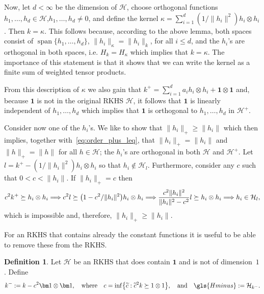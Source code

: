 \documentclass[10pt]{amsart}
\theoremstyle{definition}\newtheorem{defi}[theo]{Definition}\newtheorem{rema}[theo]{Remark}\newtheorem{exam}[theo]{Example}\newtheorem{exem}[theo]{Example}\newtheorem{nota}[theo]{Notation}
\theoremstyle{remark}
\DeclareMathOperator{\spn}{span}
\newcommand{\cH}{\mathcal{H}}
\let\oldtilde\tilde
\renewcommand*{\tilde}[1]{\mathchoice{\widetilde{#1}}{\widetilde{#1}}{\oldtilde{#1}}{\oldtilde{#1}}}
\renewcommand*{\implies}{\mathchoice{\Longrightarrow}{\Rightarrow}{\Rightarrow}{\Rightarrow}}
\let\originalleft\left
\let\originalright\right
\renewcommand{\left}{\mathopen{}\mathclose\bgroup\originalleft}
\renewcommand{\right}{\aftergroup\egroup\originalright}
\begin{document}
\pagebreak

Now, let $d< \infty $ be the dimension of $\cH$, choose orthogonal functions $h_1,\dots, h_d \in \cH$,\linebreak $h_1,\dots,h_d \not = 0$, and define the kernel $\kappa = \sum_{i=1}^d (1/\|h_i\|^2) h_i \otimes h_i$. Then $k = \kappa$. This follows because, according to the above lemma, both spaces consist of $\spn\{h_1,\dots, h_d\}$, $\|h_i\|_\kappa = \|h_i\|_k$, for all $i\leq d$, and the $h_i$'s are orthogonal in both spaces, i.e. $H_k = H_\kappa$ which implies that $k=\kappa$. The importance of this statement is that it shows that we can write the kernel as a finite sum of weighted tensor products.


From this description of $\kappa$ we also gain that $k^+ = \sum_{i=1}^d a_i h_i \otimes h_i + \bm 1 \otimes \bm 1$ and, because $\bm 1$ is not in the original RKHS $\cH$, it follows that $\bm 1$ is linearly independent of $h_1,\dots, h_d$ which implies that $\bm 1$ is orthogonal to $h_1,\dots, h_d$ in $\cH^+$.

Consider now one of the $h_i$'s. We like to show that $\|h_i\|_+ \geq \|h_i\|$ which then implies, together with~\eqref{eq:order_plus_leq}, that $\|h_i\|_+ = \|h_i\|$ and $\|h\|_+ = \|h\|$ for all $h\in \cH$; the $h_i$'s are orthogonal in both $\cH$ and $\cH^+$. Let $l = k^+ - (1/\|h_i\|^2) h_i \otimes h_i$ so that $h_i \not \in \cH_l$. Furthermore, consider any $c$ such that $0 < c < \|h_i\|$. If $\|h_i\|_+ = c$ then
\[
c^2 k^+ \succeq h_i \otimes h_i  \implies  c^2 l \succeq \left(1-c^2/\|h_i\|^2\right) h_i \otimes h_i \implies \frac{c^2\|h_i\|^2}{\|h_i\|^2-c^2} l \succeq h_i \otimes h_i \implies h_i \in \cH_l,
\]
which is impossible and, therefore, $\|h_i\|_+ \geq \|h_i\|$.


For an RKHS that contains already the constant functions it is useful to be able to remove these from the RKHS.
\begin{defi}
Let $\cH$ be an RKHS that does contain $\bm 1$ and is not of dimension~$1$. Define
\begin{equation}\label{def:k_minus}
k^- := k - c^2 \bm 1 \otimes \bm 1,\quad\text{where}\quad c =
\inf \left\{\tilde c: \tilde c^2 k \succeq 1 \otimes 1\right\}, \quad \text{and}\quad \gls{Hminus} := \cH_{k^-}.
\end{equation}
\end{defi}
\end{document}
